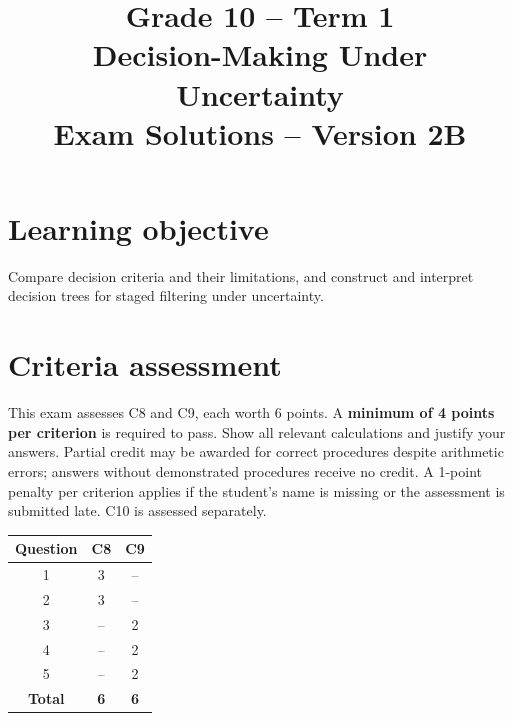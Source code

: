 \makeatletter
{}
\makeatother

\title{Grade 10 -- Term 1\\Decision-Making Under Uncertainty\\Exam Solutions -- Version 2B}
\author{}\date{}

\maketitle
\setcounter{tocdepth}{1}\setcounter{secnumdepth}{2}
\label{toc}\tableofcontents
\section*{Learning objective}
Compare decision criteria and their limitations, and construct and interpret decision trees for staged filtering under uncertainty.
\section*{Criteria assessment}
This exam assesses C8 and C9, each worth 6 points. A \textbf{minimum of 4 points per criterion} is required to pass. Show all relevant calculations and justify your answers. Partial credit may be awarded for correct procedures despite arithmetic errors; answers without demonstrated procedures receive no credit. A 1-point penalty per criterion applies if the student's name is missing or the assessment is submitted late. C10 is assessed separately.
\begin{center}
\begin{tabular}{|c|c|c|}
				\hline
				\textbf{Question} & \textbf{C8} & \textbf{C9} \\ \hline
				1 & 3 & -- \\ \hline
				2 & 3 & -- \\ \hline
				3 & -- & 2 \\ \hline
				4 & -- & 2 \\ \hline
				5 & -- & 2 \\ \hline
				\textbf{Total} & \textbf{6} & \textbf{6} \\ \hline
			\end{tabular}
\end{center}
